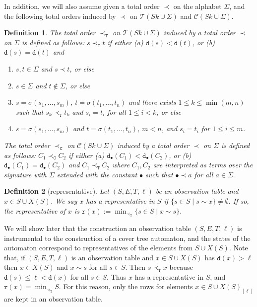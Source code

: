 \documentclass[preprint,12pt,english]{article}
\def\hole{\bullet}
\def\tr{\mathtt{r}}
\def\cC{\mathcal{C}}
\def\cT{\mathcal{T}}
\def\depth{\mathtt{d}}
\newtheorem{definition}{Definition}
\begin{document}
In addition, we will also assume given a total order $\prec$ on the alphabet $\Sigma$, and the following total orders induced by $\prec$ on $\cT(Sk\cup\Sigma)$ and $\cC(Sk\cup\Sigma).$
\begin{definition}
\label{def1}
The total order $\prec_{\mathtt{T}}$ on $\cT(Sk\cup\Sigma)$ induced by a total order $\prec$ on $\Sigma$ is defined as follows: $s\prec_{\mathtt{T}} t$ if either (a) $\depth(s)<\depth(t)$, or (b) $\depth(s)=\depth(t)$ and
\begin{enumerate}
\item $s,t\in\Sigma$ and $s\prec t$, or else
\item $s\in\Sigma$ and $t\not\in\Sigma$, or else
\item $s=\sigma(s_1,\ldots,s_m)$, $t=\sigma(t_1,\ldots,t_n)$ and there exists $1\leq k\leq \min(m,n)$ such that $s_k\prec_{\mathtt{T}} t_k$ and $s_i=t_i$ for all $1\leq i<k$, or else
\item $s=\sigma(s_1,\ldots,s_m)$ and $t=\sigma(t_1,\ldots,t_n)$, $m<n$, and $s_i=t_i$ for $1\leq i\leq m$.
\end{enumerate}
The total order $\prec_{\mathtt{C}}$ on $\cC(Sk\cup\Sigma)$ induced by a total order $\prec$ on $\Sigma$ is defined as follows:
$C_1\prec_{\mathtt{C}} C_2$ if either (a) $\depth_\hole(C_1)<\depth_\hole(C_2)$, or (b) $\depth_\hole(C_1)=\depth_\hole(C_2)$ and $C_1\prec_{\mathtt{T}}C_2$ where $C_1,C_2$ are interpreted as terms over the signature with $\Sigma$ extended with the constant $\hole$ such that $\hole\prec a$ for all $a\in \Sigma.$
\end{definition}
\begin{definition}[representative]
Let $(S,E,T,\ell)$ be an observation table and $x\in S\cup X(S)$. We say $x$ \emph{has a representative} in $S$ if $\{s\in S\mid s\sim x\}\neq \emptyset.$ If so, the \emph{representative} of  $x$ is $\tr(x):=\min_{\prec_{\mathtt{T}}} \{s\in S\mid x\sim s\}.$
\end{definition}
We will show later that the construction an observation table $(S,E,T,\ell)$ is instrumental to the construction of a cover tree automaton,  and the states of the automaton correspond to representatives of the elements from $S\cup X(S)$.
Note that, if $(S,E,T,\ell)$ is an observation table and $x\in S\cup X(S)$ has $\depth(x)>\ell$ then $x\in X(S)$ and $x\sim s$ for all $s\in S$. Then $s\prec_{\mathtt{T}} x$ because $\depth(s)\leq \ell<\depth(x)$ for all $s\in S$. Thus $x$ has a representative in $S$, and $\tr(x)=\min_{\prec_{\mathtt{T}}} S.$ For this reason, only the rows for elements $x\in S\cup X(S)_{[\ell]}$ are kept in an observation table. 
\end{document}
